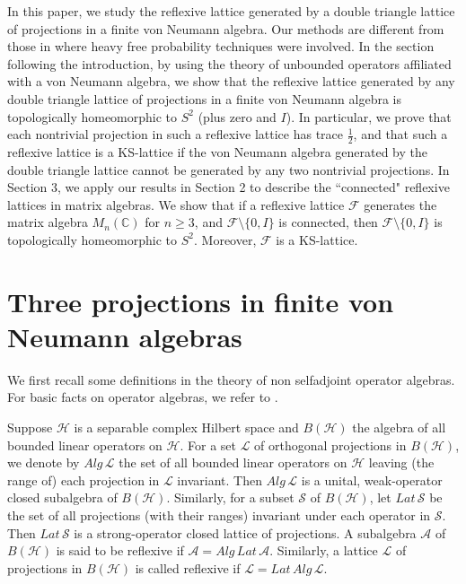 \documentclass[12pt]{article}
\newcommand{\HHH}{\mathcal H} %
\newcommand{\LLL}{\mathcal L} %
\newcommand{\FFF}{\mathcal F}
\newcommand{\C}{\mathbb C} %
\begin{document}
{In this paper, we study the reflexive lattice generated by a double
triangle lattice of projections in a finite von Neumann algebra. Our
methods are different from those in \cite{GY2} where heavy free
probability techniques were involved. In the section following the
introduction, by using the theory of unbounded operators affiliated
with a von Neumann algebra, we show that the reflexive lattice
generated by any double triangle lattice of projections in a finite
von Neumann algebra is topologically homeomorphic to $S^2$ (plus
zero and $I$). In particular, we prove that each nontrivial
projection in such a reflexive lattice has trace $\frac12$, and that
such a reflexive lattice is a KS-lattice if the von Neumann algebra
generated by the double triangle lattice cannot be generated by any
two nontrivial projections. In Section 3, we apply our results in
Section 2 to describe the ``connected" reflexive lattices in matrix
algebras. We show that if a reflexive lattice $\FFF$ generates the
matrix algebra $M_n(\C)$ for $n\geq 3$, and $\FFF\setminus\{0,I\}$
is connected, then $\FFF\setminus\{0,I\}$ is topologically
homeomorphic to $S^2$. Moreover, $\FFF$ is a KS-lattice.


\section{Three projections in finite von Neumann algebras}

We first recall some definitions in the theory of non selfadjoint
operator algebras. For basic facts on operator algebras, we refer to
\cite{KR, RR}.

Suppose $\HHH$ is a separable complex Hilbert space and $B(\HHH)$
the algebra of all bounded linear operators on $\HHH$. For a set
$\LLL$ of orthogonal projections in $B(\HHH)$, we denote by
$Alg\,\LLL$ the set of all bounded linear operators on $\HHH$
leaving (the range of) each projection in $\LLL$ invariant. Then
$Alg\,\LLL$ is a unital, weak-operator closed subalgebra of
$B(\HHH)$. Similarly, for a subset $\mathcal{S}$ of $B(\HHH)$, let
$Lat\,\mathcal{S}$ be the set of all projections (with their ranges)
invariant under each operator in $\mathcal{S}$. Then
$Lat\,\mathcal{S}$ is a strong-operator closed lattice of
projections. A subalgebra $\mathcal{A}$ of $B(\HHH)$ is said to be
reflexive if $\mathcal{A}=Alg\,Lat\,\mathcal{A}$. Similarly, a
lattice $\LLL$ of projections in $B(\HHH)$ is called reflexive if
$\LLL=Lat\,Alg\,\LLL$.

}
\end{document}
